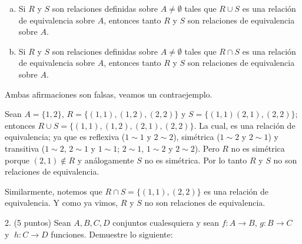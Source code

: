 \documentclass[letterpaper,11pt]{article}
\begin{document}
  \begin{adjustwidth}{1cm}{0cm}
    \begin{enumerate}[(a)]
      \item Si $R$ y $S$ son relaciones definidas sobre $A \neq \emptyset$ tales
        que $R \cup S$ es una relación de equivalencia sobre $A$, entonces tanto
        $R$ y $S$ son relaciones de equivalencia sobre $A$.

      \item Si $R$ y $S$ son relaciones definidas sobre $A \neq \emptyset$ tales
        que $R \cap S$ es una relación de equivalencia sobre $A$, entonces
        tanto $R$ y $S$ son relaciones de equivalencia sobre $A$. \newline

    \end{enumerate}

    Ambas afirmaciones son falsas, veamos un contraejemplo. \newline

    Sean $A = \{ 1, 2 \}$, $R = \{ (1, 1), (1, 2), (2, 2) \}$ y $S = \{(1, 1) (2, 1), (2, 2) \}$; \\
    entonces $R \cup S = \{ (1, 1), (1, 2), (2, 1), (2, 2) \}$. \newline
    La cual, es una relación de equivalencia; ya que es reflexiva ($1 \sim 1$ y $2 \sim 2$),
    simétrica ($1 \sim 2$ y $2 \sim 1$) y transitiva ($1 \sim 2$, $2 \sim 1$ y $1 \sim 1$;
    $2 \sim 1$, $1 \sim 2$ y $2 \sim 2$).
    Pero $R$ no es simétrica porque $(2, 1) \notin R$ y análogamente $S$ no es simétrica. \newline
    Por lo tanto $R$ y $S$ no son relaciones de equivalencia. \newline

    Similarmente, notemos que $R \cap S = \{ (1, 1), (2, 2) \}$ es una relación de equivalencia.
    Y como ya vimos, $R$ y $S$ no son relaciones de equivalencia. \newline
  \end{adjustwidth}

  2. (5 puntos) Sean $A, B, C, D$ conjuntos cualesquiera y sean
  $f : A \rightarrow B$, $g : B \rightarrow C \;$ y $\; h : C \rightarrow D$ funciones.
  Demuestre lo siguiente: \newline
\end{document}
